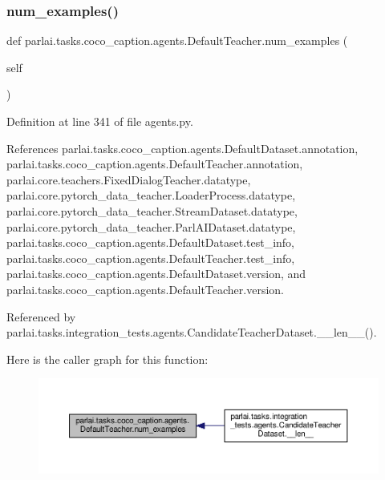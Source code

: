 \subsubsection{\texorpdfstring{num\+\_\+examples()}{num\_examples()}}
{\footnotesize\ttfamily def parlai.\+tasks.\+coco\+\_\+caption.\+agents.\+Default\+Teacher.\+num\+\_\+examples (\begin{DoxyParamCaption}\item[{}]{self }\end{DoxyParamCaption})}



Definition at line 341 of file agents.\+py.



References parlai.\+tasks.\+coco\+\_\+caption.\+agents.\+Default\+Dataset.\+annotation, parlai.\+tasks.\+coco\+\_\+caption.\+agents.\+Default\+Teacher.\+annotation, parlai.\+core.\+teachers.\+Fixed\+Dialog\+Teacher.\+datatype, parlai.\+core.\+pytorch\+\_\+data\+\_\+teacher.\+Loader\+Process.\+datatype, parlai.\+core.\+pytorch\+\_\+data\+\_\+teacher.\+Stream\+Dataset.\+datatype, parlai.\+core.\+pytorch\+\_\+data\+\_\+teacher.\+Parl\+A\+I\+Dataset.\+datatype, parlai.\+tasks.\+coco\+\_\+caption.\+agents.\+Default\+Dataset.\+test\+\_\+info, parlai.\+tasks.\+coco\+\_\+caption.\+agents.\+Default\+Teacher.\+test\+\_\+info, parlai.\+tasks.\+coco\+\_\+caption.\+agents.\+Default\+Dataset.\+version, and parlai.\+tasks.\+coco\+\_\+caption.\+agents.\+Default\+Teacher.\+version.



Referenced by parlai.\+tasks.\+integration\+\_\+tests.\+agents.\+Candidate\+Teacher\+Dataset.\+\_\+\+\_\+len\+\_\+\+\_\+().

Here is the caller graph for this function\+:
\nopagebreak
\begin{figure}[H]
\begin{center}
\leavevmode
\includegraphics[width=350pt]{classparlai_1_1tasks_1_1coco__caption_1_1agents_1_1DefaultTeacher_abc57dc81be0b084f28af97aa62c2d531_icgraph}
\end{center}
\end{figure}
\mbox{\label{classparlai_1_1tasks_1_1coco__caption_1_1agents_1_1DefaultTeacher_ac3b29ac1add9d464b365d472caafcbaa}} 
